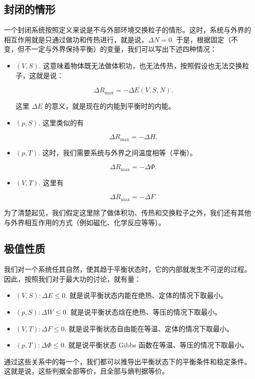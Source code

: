 \subsection{封闭的情形}
一个封闭系统按照定义来说是不与外部环境交换粒子的情形。这时，系统与外界的相互作用就是只通过做功和传热进行，就是说，$\Delta N = 0.$ 于是，根据固定（不变，但不一定与外界保持平衡）的变量，我们可以写出下述四种情况：
\begin{itemize}
    \item $\left( V,S \right).$ 这意味着物体既无法做体积功，也无法传热，按照假设也无法交换粒子，这就是说：\begin{linenomath}\begin{equation}\Delta R_{\max} = -\Delta E\left( V,S,N \right).\end{equation}\end{linenomath} 这里 $\Delta E$ 的意义，就是现在的内能到平衡时的内能。
    \item $\left( p,S \right).$ 这里类似的有 \begin{linenomath}\begin{equation}\Delta R_{\max} = -\Delta H.\end{equation}\end{linenomath}
    \item $\left( p,T\right).$ 这时，我们需要系统与外界之间温度相等（平衡）。\begin{linenomath}\begin{equation}\Delta R_{\max} = -\Delta \Phi.\end{equation}\end{linenomath}
    \item $\left( V,T\right).$ 这里有 \begin{linenomath}\begin{equation}\Delta R_{\max} = -\Delta F.\end{equation}\end{linenomath}
\end{itemize}
为了清楚起见，我们假定这里除了做体积功、传热和交换粒子之外，我们还有其他与外界相互作用的方式（例如磁化、化学反应等等）。
\subsection{极值性质}
我们对一个系统任其自然，使其趋于平衡状态时，它的内部就发生不可逆的过程。因此，按照我们对于最大功的讨论，就有量：
\begin{itemize}
    \item $\left( V,S \right):\Delta E \leq 0.$ 就是说平衡状态内能在绝热、定体的情况下取最小。
    \item $\left( p,S \right):\Delta W \leq 0.$ 就是说平衡状态焓在绝热、等压的情况下取最小。
    \item $\left( V,T \right):\Delta F \leq 0.$ 就是说平衡状态自由能在等温、定体的情况下取最小。
    \item $\left( p,T \right):\Delta \Phi \leq 0.$ 就是说平衡状态 Gibbs 函数在等温、等压的情况下取最小。
\end{itemize}
通过这些关系中的每一个，我们都可以推导出平衡状态下的平衡条件和稳定条件。这就是说，这些判据全部等价，且全部与熵判据等价。
